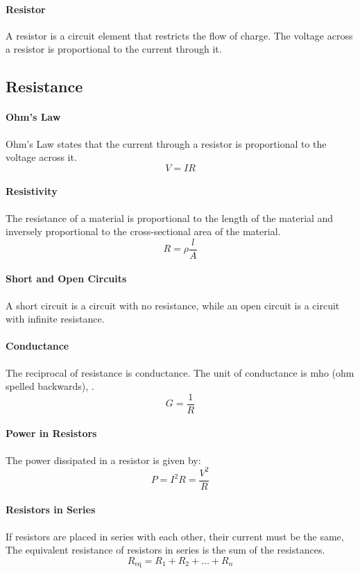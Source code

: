 \documentclass[11pt]{article}
\begin{document}
\paragraph{Resistor} A resistor is a circuit element that restricts the flow of charge. The voltage across a resistor is proportional to the current through it.

\subsection{Resistance}
\paragraph{Ohm's Law} Ohm's Law states that the current through a resistor is proportional to the voltage across it.
\begin{equation}
    V = IR
\end{equation}
\paragraph{Resistivity} The resistance of a material is proportional to the length of the material and inversely proportional to the cross-sectional area of the material.
\begin{equation}
    R = \rho \frac{l}{A}
\end{equation}
\paragraph{Short and Open Circuits} A short circuit is a circuit with no resistance, while an open circuit is a circuit with infinite resistance.
\paragraph{Conductance} The reciprocal of resistance is conductance. The unit of conductance is mho (ohm spelled backwards), .
\begin{equation}
    G = \frac{1}{R}
\end{equation}
\paragraph{Power in Resistors} The power dissipated in a resistor is given by:
\begin{equation}
    P = I^2R = \frac{V^2}{R}
\end{equation}
\paragraph{Resistors in Series} If resistors are placed in series with each other, their current must be the same, The equivalent resistance of resistors in series is the sum of the resistances.
\begin{equation}
    R_{\text{eq}} = R_1 + R_2 + \dots + R_n
\end{equation}
\end{document}
